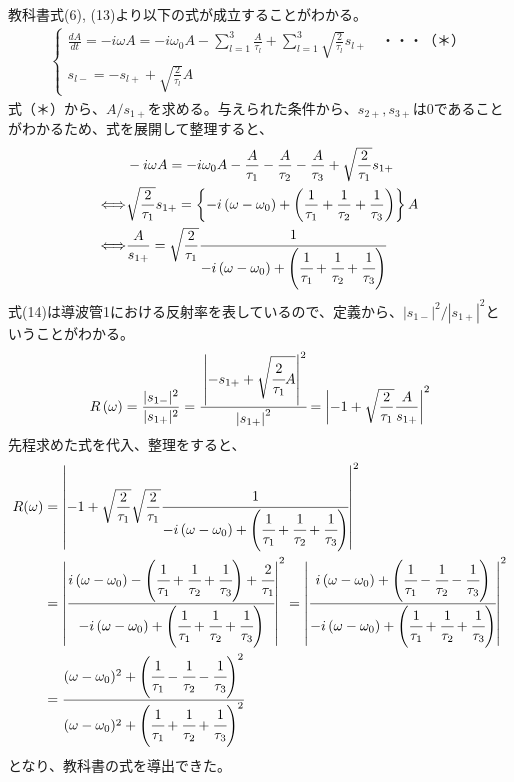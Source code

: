 \documentclass[a4paper,11pt,dvipdfmx]{jsarticle}
\begin{document}
\begin{enumerate}
    教科書式(6), (13)より以下の式が成立することがわかる。
    \begin{align*}
      \begin{cases}
        \displaystyle \frac{dA}{dt} = - i \omega A = - i \omega_0 A - \sum_{l=1}^{3} \frac{A}{\tau_l} + \sum_{l=1}^{3} \sqrt{\frac{2}{\tau_l}}s_{l+} \quad ・・・（＊）
        \\
        \displaystyle s_{l-} = - s_{l+} + \sqrt{\frac{2}{\tau_l}} A
      \end{cases}
    \end{align*}
    式（＊）から、$A / s_{1+}$を求める。与えられた条件から、$s_{2+}, s_{3+}$は0であることがわかるため、式を展開して整理すると、
    \begin{align*}
      & - i \omega A = - i \omega_0 A - \frac{A}{\tau_1} - \frac{A}{\tau_2} - \frac{A}{\tau_3} + \sqrt{\frac{2}{\tau_1}}s_{1+} \\
      \Longleftrightarrow & \sqrt{\frac{2}{\tau_1}}s_{1+} = \left\{ - i \left( \omega - \omega_0 \right) + \left( \frac{1}{\tau_1} + \frac{1}{\tau_2} + \frac{1}{\tau_3} \right) \right\}A \\
      \Longleftrightarrow & \frac{A}{s_{1+}} = \sqrt{\frac{2}{\tau_1}} \cfrac{1}{ - i \left( \omega - \omega_0 \right) + \left( \cfrac{1}{\tau_1} + \cfrac{1}{\tau_2} + \cfrac{1}{\tau_3} \right) }
    \end{align*}
    式(14)は導波管1における反射率を表しているので、定義から、$|s_{1-}|^2/|s_{1+}|^2$ということがわかる。
    \begin{align*}
      R\left( \omega \right) = \frac{|s_{1-}|^2}{|s_{1+}|^2} = \cfrac{\left|- s_{1+} + \sqrt{\cfrac{2}{\tau_1}A} \right|^2}{\left|s_{1+} \right|^2} = \left| - 1 + \sqrt{\frac{2}{\tau_1}} \frac{A}{s_{1+}} \right|^2
    \end{align*}
    先程求めた式を代入、整理をすると、
    \begin{align*}
      R(\omega) &= \left| -1 + \sqrt{\frac{2}{\tau_1}} \sqrt{\frac{2}{\tau_1}} \cfrac{1}{ - i \left( \omega - \omega_0 \right) + \left( \cfrac{1}{\tau_1} + \cfrac{1}{\tau_2} + \cfrac{1}{\tau_3} \right) } \right|^2 \\
      &= \left| \cfrac{i \left( \omega - \omega_0 \right) - \left( \cfrac{1}{\tau_1} + \cfrac{1}{\tau_2} + \cfrac{1}{\tau_3} \right) + \cfrac{2}{\tau_1}}{ - i \left( \omega - \omega_0 \right) + \left( \cfrac{1}{\tau_1} + \cfrac{1}{\tau_2} + \cfrac{1}{\tau_3} \right) } \right|^2 = \left| \cfrac{i \left( \omega - \omega_0 \right) + \left( \cfrac{1}{\tau_1} - \cfrac{1}{\tau_2} - \cfrac{1}{\tau_3} \right)}{ - i \left( \omega - \omega_0 \right) + \left( \cfrac{1}{\tau_1} + \cfrac{1}{\tau_2} + \cfrac{1}{\tau_3} \right) } \right|^2 \\
      &= \cfrac{(\omega - \omega_0)^2 + \left( \cfrac{1}{\tau_1} - \cfrac{1}{\tau_2} - \cfrac{1}{\tau_3} \right)^2 }{(\omega - \omega_0)^2 + \left( \cfrac{1}{\tau_1} + \cfrac{1}{\tau_2} + \cfrac{1}{\tau_3} \right)^2}
    \end{align*}
  となり、教科書の式を導出できた。


\end{enumerate}
\end{document}
